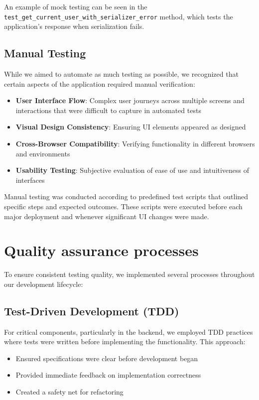 An example of mock testing can be seen in the \texttt{test\_get\_current\_user\_with\_serializer\_error} method, which tests the application's response when serialization fails.

\subsection{Manual Testing}

While we aimed to automate as much testing as possible, we recognized that certain aspects of the application required manual verification:

\begin{itemize}
    \item \textbf{User Interface Flow}: Complex user journeys across multiple screens and interactions that were difficult to capture in automated tests
    \item \textbf{Visual Design Consistency}: Ensuring UI elements appeared as designed
    \item \textbf{Cross-Browser Compatibility}: Verifying functionality in different browsers and environments
    \item \textbf{Usability Testing}: Subjective evaluation of ease of use and intuitiveness of interfaces
\end{itemize}

Manual testing was conducted according to predefined test scripts that outlined specific steps and expected outcomes. These scripts were executed before each major deployment and whenever significant UI changes were made.

\section{Quality assurance processes}
\label{sect:testing:process}

To ensure consistent testing quality, we implemented several processes throughout our development lifecycle:

\subsection{Test-Driven Development (TDD)}

For critical components, particularly in the backend, we employed TDD practices where tests were written before implementing the functionality. This approach:

\begin{itemize}
    \item Ensured specifications were clear before development began
    \item Provided immediate feedback on implementation correctness
    \item Created a safety net for refactoring
\end{itemize}

